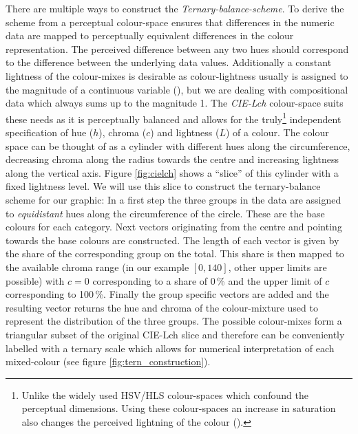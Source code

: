 \documentclass[a4paper]{scrartcl}
\begin{document}
\begin{appendix}
There are multiple ways to construct the \emph{Ternary-balance-scheme}. To derive the scheme from a perceptual colour-space ensures that differences in the numeric data are mapped to perceptually equivalent differences in the colour representation. The perceived difference between any two hues should correspond to the difference between the underlying data values. Additionally a constant lightness of the colour-mixes is desirable as colour-lightness usually is assigned to the magnitude of a continuous variable (\cite{Brewer1994}), but we are dealing with compositional data which always sums up to the magnitude 1. The \emph{CIE-Lch} colour-space suits these needs as it is perceptually balanced and allows for the truly\footnote{Unlike the widely used HSV/HLS colour-spaces which confound the perceptual dimensions. Using these colour-spaces an increase in saturation also changes the perceived lightning of the colour (\cite{Brewer1999}).} independent specification of hue ($h$), chroma ($c$) and lightness ($L$) of a colour. The colour space can be thought of as a cylinder with different hues along the circumference, decreasing chroma along the radius towards the centre and increasing lightness along the vertical axis. Figure \ref{fig:cielch} shows a \enquote{slice} of this cylinder with a fixed lightness level. We will use this slice to construct the ternary-balance scheme for our graphic: In a first step the three groups in the data are assigned to \emph{equidistant} hues along the circumference of the circle. These are the base colours for each category. Next vectors originating from the centre and pointing towards the base colours are constructed. The length of each vector is given by the share of the corresponding group on the total. This share is then mapped to the available chroma range (in our example $[0,140]$, other upper limits are possible) with $c = 0$ corresponding to a share of 0\,\% and the upper limit of $c$ corresponding to 100\,\%. Finally the group specific vectors are added and the resulting vector returns the hue and chroma of the colour-mixture used to represent the distribution of the three groups. The possible colour-mixes form a triangular subset of the original CIE-Lch slice and therefore can be conveniently labelled with a ternary scale which allows for numerical interpretation of each mixed-colour (see figure \ref{fig:tern_construction}).


\end{appendix}
\end{document}
